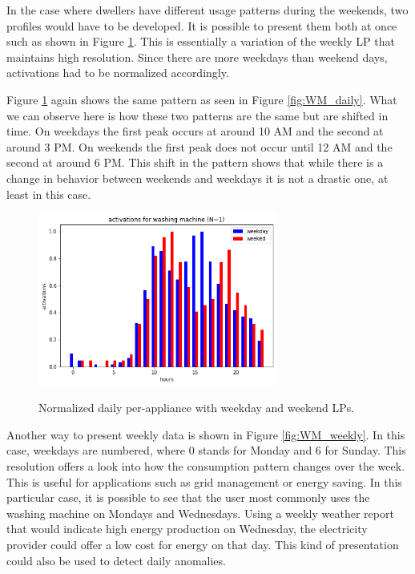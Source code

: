 In the case where dwellers have different usage patterns during the weekends, two profiles would have to be developed.
It is possible to present them both at once such as shown in Figure \ref{fig:WM_ww_daily}. 
This is essentially a variation of the weekly LP that maintains high resolution.
Since there are more weekdays than weekend days, activations had to be normalized accordingly.

Figure \ref{fig:WM_ww_daily} again shows the same pattern as seen in Figure \ref{fig:WM_daily}.
What we can observe here is how these two patterns are the same but are shifted in time. 
On weekdays the first peak occurs at around 10 AM and the second at around 3 PM.
On weekends the first peak does not occur until 12 AM and the second at around 6 PM.
This shift in the pattern shows that while there is a change in behavior between weekends and weekdays it is not a
drastic one, at least in this case. 

\begin{figure}[H]
	\centering
	\caption{Normalized daily per-appliance with weekday and weekend LPs.}
	\includegraphics[width=0.7\textwidth]{../Figures/LPS/WM_ww_daily.png}
	\label{fig:WM_ww_daily}
\end{figure}

Another way to present weekly data is shown in Figure \ref{fig:WM_weekly}.
In this case, weekdays are numbered, where 0 stands for Monday and 6 for Sunday.
This resolution offers a look into how the consumption pattern changes over the week. 
This is useful for applications such as grid management or energy saving.
In this particular case, it is possible to see that the user most commonly uses the washing machine on Mondays and Wednesdays.
Using a weekly weather report that would indicate high energy production on Wednesday, the electricity provider could offer a low cost for energy on that day. 
This kind of presentation could also be used to detect daily anomalies.

